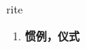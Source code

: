 
\begin{frame}
{\huge rite}
\begin{center}
\begin{enumerate}\Large
  \item \textbf{惯例，仪式}
\end{enumerate}
\end{center}
\end{frame}
